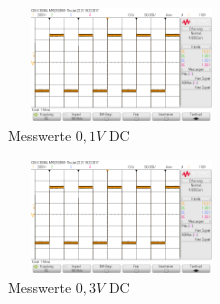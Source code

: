 \begin{table}[H]
\begin{minipage}{.5\textwidth}
\begin{figure}[H]
  \begin{center}
   \includegraphics[height=3cm,width=6cm]{OsziBilder/bsp2_time.png}
  \end{center}
  \caption{Messwerte $0,1V$ DC}
\end{figure}
\end{minipage}
\begin{minipage}{.5\textwidth}
\begin{figure}[H]
  \begin{center}
   \includegraphics[height=3cm,width=6cm]{OsziBilder/bsp2_time.png}
  \end{center}
   \caption{Messwerte $0,3V$ DC}
\end{figure}
\end{minipage}
\end{table}
